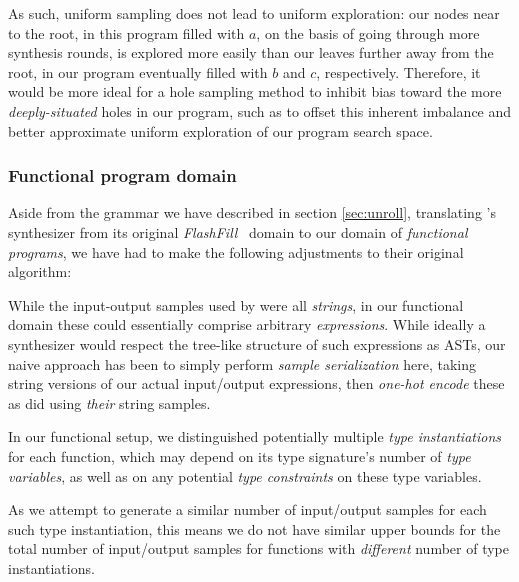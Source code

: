 \documentclass{article}
\begin{document}
As such, uniform sampling does not lead to uniform exploration:
our nodes near to the root, in this program filled with $a$,
on the basis of going through more synthesis rounds,
is explored more easily than our leaves further away from the root,
in our program eventually filled with $b$ and $c$, respectively.
Therefore, it would be more ideal for a hole sampling method to inhibit
bias toward the more \emph{deeply-situated} holes in our program,
such as to offset this inherent imbalance and better approximate
uniform exploration of our program search space.


\subsubsection{Functional program domain} \label{sec:fp}

Aside from the grammar we have described in section \ref{sec:unroll},
translating \citet{nsps}'s synthesizer from its original \emph{FlashFill}~\citep{prose} domain to our domain of \emph{functional programs},
we have had to make the following adjustments to their original algorithm:

    While the input-output samples used by \citet{nsps} were all \emph{strings},
    in our functional domain these could essentially comprise arbitrary \emph{expressions}.
    While ideally a synthesizer would respect the tree-like structure of such expressions as ASTs,
    our naive approach has been to simply perform \emph{sample serialization} here,
    taking string versions of our actual input/output expressions,
    then \emph{one-hot encode} these as \citet{nsps} did using \emph{their} string samples.

    In our functional setup,
    we distinguished potentially multiple \emph{type instantiations} for each function,
    which may depend on its type signature's number of \emph{type variables},
    as well as on any potential \emph{type constraints} on these type variables.

    As we attempt to generate a similar number of input/output samples for each such type instantiation,
    this means we do not have similar upper bounds for the total number of input/output samples for functions with \emph{different} number of type instantiations.
\end{document}
